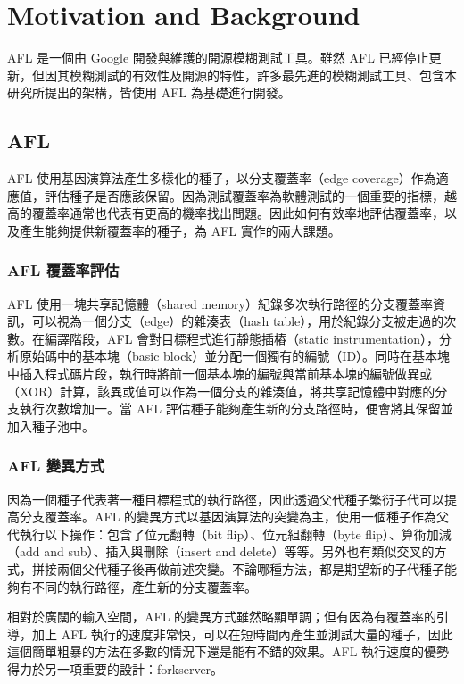 \chapter{Motivation and Background}
\label{ch:motivation}

AFL 是一個由 Google 開發與維護的開源模糊測試工具。雖然 AFL 已經停止更新，但因其模糊測試的有效性及開源的特性，許多最先進的模糊測試工具、包含本研究所提出的架構，皆使用 AFL 為基礎進行開發。

\section{AFL}

AFL 使用基因演算法產生多樣化的種子，以分支覆蓋率（edge coverage）作為適應值，評估種子是否應該保留。因為測試覆蓋率為軟體測試的一個重要的指標，越高的覆蓋率通常也代表有更高的機率找出問題。因此如何有效率地評估覆蓋率，以及產生能夠提供新覆蓋率的種子，為 AFL 實作的兩大課題。

\subsection{AFL 覆蓋率評估}

AFL 使用一塊共享記憶體（shared memory）紀錄多次執行路徑的分支覆蓋率資訊，可以視為一個分支（edge）的雜湊表（hash table），用於紀錄分支被走過的次數。在編譯階段，AFL 會對目標程式進行靜態插樁（static instrumentation），分析原始碼中的基本塊（basic block）並分配一個獨有的編號（ID）。同時在基本塊中插入程式碼片段，執行時將前一個基本塊的編號與當前基本塊的編號做異或（XOR）計算，該異或值可以作為一個分支的雜湊值，將共享記憶體中對應的分支執行次數增加一。當 AFL 評估種子能夠產生新的分支路徑時，便會將其保留並加入種子池中。

\subsection{AFL 變異方式}

因為一個種子代表著一種目標程式的執行路徑，因此透過父代種子繁衍子代可以提高分支覆蓋率。AFL 的變異方式以基因演算法的突變為主，使用一個種子作為父代執行以下操作：包含了位元翻轉（bit flip）、位元組翻轉（byte flip）、算術加減（add and sub）、插入與刪除（insert and delete）等等。另外也有類似交叉的方式，拼接兩個父代種子後再做前述突變。不論哪種方法，都是期望新的子代種子能夠有不同的執行路徑，產生新的分支覆蓋率。

相對於廣闊的輸入空間，AFL 的變異方式雖然略顯單調；但有因為有覆蓋率的引導，加上 AFL 執行的速度非常快，可以在短時間內產生並測試大量的種子，因此這個簡單粗暴的方法在多數的情況下還是能有不錯的效果。AFL 執行速度的優勢得力於另一項重要的設計：forkserver。

